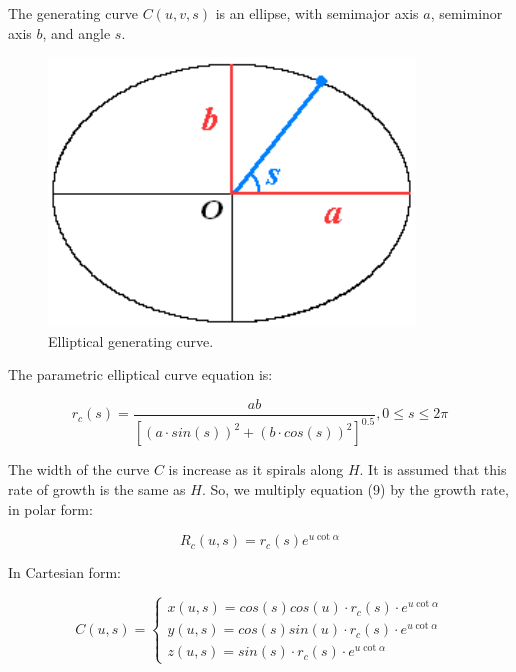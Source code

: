 \documentclass[a4paper]{article}
\begin{document}
\pagebreak

The generating curve $C(u,v,s)$ is an ellipse, with semimajor axis $a$,  semiminor axis $b$, and angle $s$.

\begin{figure}[h]
	\centering\includegraphics[scale=1.5]{./img/generating_curve_ellipse.png}
	\caption{Elliptical generating curve. \cite{JORGEPICADO}}
	\label{3d-printed-torus} %
\end{figure}

The parametric elliptical curve equation is:

\begin{equation}
	r_c(s) = \frac{ab}{[(a \cdot sin(s))^2 + (b \cdot cos(s))^2]^{0.5}}, 0 \le s \le 2\pi
\end{equation}

The width of the curve $C$ is increase as it spirals along $H$. It is assumed that this rate of growth is the same as $H$. So, we multiply equation (9) by the growth rate, in polar form:

\begin{equation}
	R_c(u, s) = r_c(s) e^{u \cot \alpha}
\end{equation}

In Cartesian form:

\begin{equation}
	C(u, s) = 
	\begin{cases}
		x(u, s) = cos(s) cos(u) \cdot r_c(s) \cdot e^{u \cot \alpha}\\
		y(u, s) = cos(s) sin(u) \cdot r_c(s) \cdot e^{u \cot \alpha}\\
		z(u, s) = sin(s) \cdot r_c(s) \cdot e^{u \cot \alpha}
	\end{cases}
\end{equation}
\end{document}
